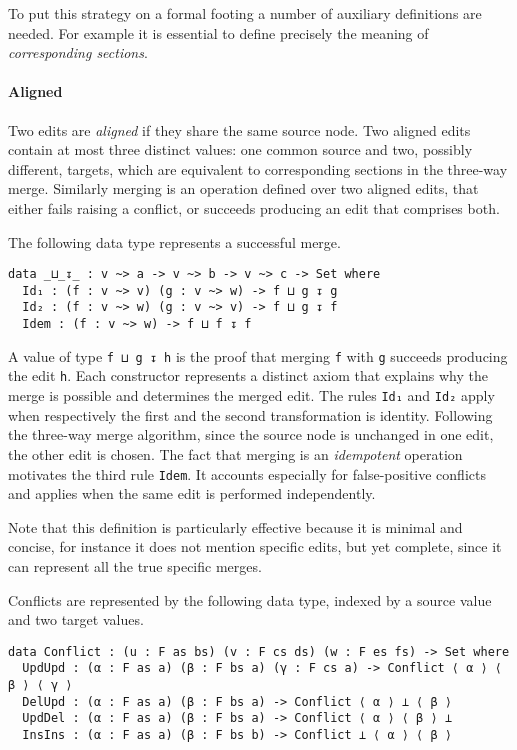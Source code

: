 \documentclass[../Thesis.tex]{subfiles}
\begin{document}
	To put this strategy on a formal footing a number of auxiliary definitions 
	are needed. For example it is essential to define precisely the meaning 
	of \emph{corresponding sections}. 
	
	\paragraph{Aligned}
	Two edits are \emph{aligned} if they share the same source node.	
	Two aligned edits contain at most three distinct values: 
	one common source and two, 	possibly different, targets, which 
	are equivalent to corresponding sections in the three-way merge.
	Similarly merging is an operation defined over two aligned edits, 
	that either fails raising a conflict, or succeeds producing an edit that 
	comprises both. 

	The following data type represents a successful merge.


\begin{verbatim}	
data _⊔_↧_ : v ~> a -> v ~> b -> v ~> c -> Set where
  Id₁ : (f : v ~> v) (g : v ~> w) -> f ⊔ g ↧ g
  Id₂ : (f : v ~> w) (g : v ~> v) -> f ⊔ g ↧ f
  Idem : (f : v ~> w) -> f ⊔ f ↧ f
\end{verbatim}

	A value of type \texttt{f ⊔ g ↧ h} is the proof that merging \texttt{f} with
	\texttt{g} succeeds producing the edit \texttt{h}.
	Each constructor represents a distinct axiom that explains why
	the merge is possible and determines the merged edit.
	The rules \texttt{Id₁} and \texttt{Id₂} apply when 
	respectively the first and the second transformation is identity.
	Following the three-way merge algorithm, since the source node
	is unchanged in one edit, the other edit is chosen.
	The fact that merging is an \emph{idempotent} operation motivates the 
	third rule \texttt{Idem}.
	It accounts especially for false-positive conflicts and applies 
	when the same edit is performed independently.
	
	Note that this definition is particularly effective because it is 
	minimal and concise, for instance it does not mention specific
	edits, but yet complete, since it can represent all the true specific merges.

	Conflicts are represented by the following data type, indexed by 
	a source value and two target values.

\begin{verbatim}	
data Conflict : (u : F as bs) (v : F cs ds) (w : F es fs) -> Set where
  UpdUpd : (α : F as a) (β : F bs a) (γ : F cs a) -> Conflict ⟨ α ⟩ ⟨ β ⟩ ⟨ γ ⟩
  DelUpd : (α : F as a) (β : F bs a) -> Conflict ⟨ α ⟩ ⊥ ⟨ β ⟩
  UpdDel : (α : F as a) (β : F bs a) -> Conflict ⟨ α ⟩ ⟨ β ⟩ ⊥ 
  InsIns : (α : F as a) (β : F bs b) -> Conflict ⊥ ⟨ α ⟩ ⟨ β ⟩
\end{verbatim}
	
\end{document}

